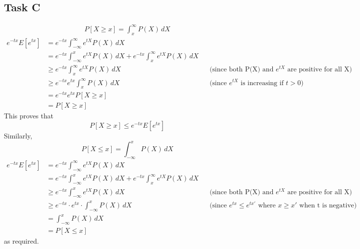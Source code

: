 \subsection{Task C}
\begin{align*}
    P[X\ge x] = \int_{x}^{\infty} P(X) \, dX
\end{align*}
\begin{align*}
    e^{-tx}E[e^{tx}] & = e^{-tx} \int_{-\infty}^{\infty} e^{tX} P(X) \, dX && \\
    & = e^{-tx}\int_{-\infty}^x e^{tX} P(X) \, dX + e^{-tx}\int_{x}^{\infty} e^{tX} P(X) \, dX && \\
    & \ge e^{-tx} \int_{x}^{\infty} e^{tX} P(X) \, dX && \text{(since both P(X) and $e^{tX}$ are positive for all X)}\\
    & \ge e^{-tx}  e^{tx} \int_{x}^{\infty} P(X) \, dX &&\text{(since $e^{tX}$ is increasing if $t>0$)}\\
    & = e^{-tx} e^{tx} P[X \ge x] && \\
    & = P[X \ge x] &&
\end{align*}
This proves that 
\begin{equation}
    \label{eq:1}
    P[X\ge x] \le e^{-tx}E[e^{tx}]
\end{equation}
Similarly, 
\[
    P[X\le x] = \int_{-\infty}^{x} P(X) \, dX
\]
\begin{align*}
    e^{-tx}E[e^{tx}] & = e^{-tx} \int_{-\infty}^{\infty} e^{tX} P(X) \, dX && \\
    & = e^{-tx}\int_{-\infty}^x e^{tX} P(X) \, dX + e^{-tx}\int_{x}^{\infty} e^{tX} P(X) \, dX && \\
    & \ge e^{-tx} \int_{-\infty}^{x} e^{tX} P(X) \, dX && \text{(since both P(X) and $e^{tX}$ are positive for all X)}\\
    & \ge e^{-tx}\cdot e^{tx} \cdot \int_{-\infty}^{x}P(X)\, dX && \text{(since $e^{tx} \le e^{tx'}$ where $x \ge x'$ when t is negative)}\\
    & = \int_{-\infty}^{x} P(X) \, dX && \\
    & = P[X \le x] &&
    \label{eq:1}
\end{align*}
as required.
